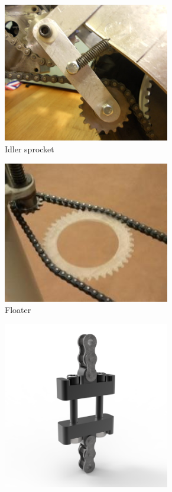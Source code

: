 \begin{figure}[H]
	\begin{subfigure}[b]{.32\linewidth}
		\includegraphics[width=0.8\textwidth]{imgs/chain_idler.jpeg}
		\caption{Idler sprocket}
	\end{subfigure}\begin{subfigure}[b]{.32\linewidth}
		\includegraphics[width=0.8\textwidth]{imgs/chain_floater.jpeg}
		\caption{Floater}
	\end{subfigure}\begin{subfigure}[b]{.32\linewidth}
		\includegraphics[width=0.8\textwidth]{imgs/chain_inlinetens.png}

\end{subfigure}
\end{figure}
